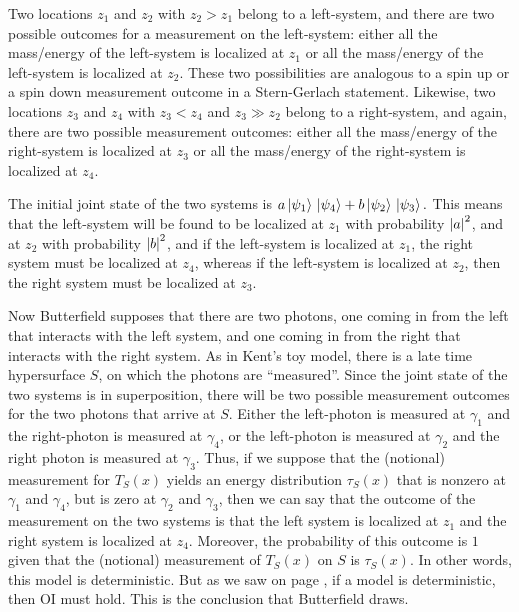 Two locations $z_1$ and $z_2$ with $z_2>z_1$ belong to a left-system, and there are two possible outcomes for a measurement on the left-system: either all the mass/energy of the left-system is localized at $z_1$ or all the mass/energy of the left-system  is localized at $z_2$. These two possibilities are analogous to a spin up or a spin down measurement outcome in a Stern-Gerlach statement. Likewise, two locations $z_3$ and $z_4$ with $z_3<z_4$ and $z_3\gg z_2$ belong to a right-system, and again, there are two possible measurement outcomes: either all the mass/energy of the right-system is localized at $z_3$ or all the mass/energy of the right-system  is localized at $z_4$. 

The initial joint state of the two systems is 
$a \ket*{\psi_1}\ket*{\psi_4} +b \ket*{\psi_2}\ket*{\psi_3}.$
This means that the left-system will be found to be localized at $z_1$ with probability $\abs{a}^2$, and at $z_2$ with probability $\abs{b}^2$, and if the left-system is localized at $z_1$, the  right system must be localized at $z_4$, whereas if the left-system is localized at $z_2$, then the right system must be localized at $z_3$.  

Now Butterfield supposes that there are two photons, one coming in from the left that interacts with the left system, and one coming in from the right that interacts with the right system. As in Kent's toy model, there is a late time hypersurface $S$, on which the photons are ``measured''. Since the joint state of the two systems  is in superposition, there will be two possible measurement outcomes for the two photons that arrive at $S$. Either the left-photon is measured at $\gamma_1$ and the right-photon is measured at $\gamma_4$, or the left-photon is measured at $\gamma_2$ and the right photon is measured at $\gamma_3$. Thus, if we suppose that the (notional) measurement for $T_S(x)$ yields an energy distribution $\tau_S(x)$ that is nonzero at $\gamma_1$ and $\gamma_4$, but is zero at $\gamma_2$ and $\gamma_3$, then we can say that the outcome of the measurement on the two systems is that the left system is localized at $z_1$ and the right system is localized at $z_4$. Moreover, the probability of this outcome is $1$ given that the (notional) measurement of $T_S(x)$ on $S$ is $\tau_S(x)$. In other words, this model is deterministic. But as we saw on page \pageref{OIdet}, if a model is deterministic, then OI must hold. This is the conclusion that Butterfield draws. 

